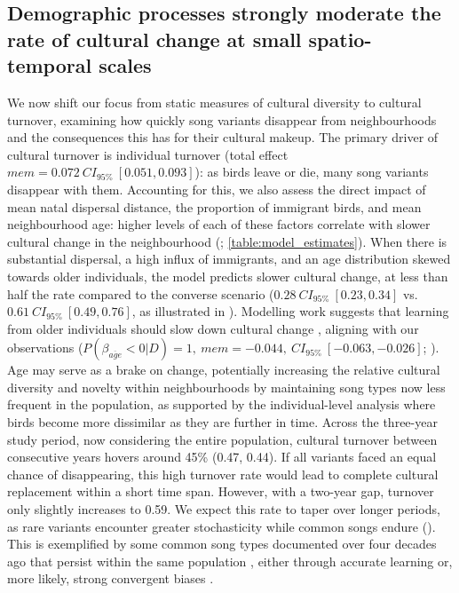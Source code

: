 \documentclass[9pt, twocolumn, twoside]{gsajnl}
\begin{document}
\subsection{Demographic processes strongly moderate the rate of cultural change at small spatio-temporal scales}

We now shift our focus from static measures of cultural diversity to cultural turnover, examining how quickly song variants disappear from neighbourhoods and the consequences this has for their cultural makeup. The primary driver of cultural turnover is individual turnover (total effect $mem = 0.072~CI_{95\%}~[0.051, 0.093]$): as birds leave or die, many song variants disappear with them. Accounting for this, we also assess the direct impact of mean natal dispersal distance, the proportion of immigrant birds, and mean neighbourhood age: higher levels of each of these factors correlate with slower cultural change in the neighbourhood (; \autoref{table:model_estimates}). When there is substantial dispersal, a high influx of immigrants, and an age distribution skewed towards older individuals, the model predicts slower cultural change, at less than half the rate compared to the converse scenario ($0.28~CI_{95\%}~[0.23, 0.34]$ vs. $0.61~CI_{95\%}~[0.49, 0.76]$, as illustrated in ). 
Modelling work suggests that learning from older individuals should slow down cultural change \parencite{kirby2021}, aligning with our observations ($P(\beta_{\overline{age}} < 0 | D) = 1,~mem=-0.044,~CI_{95\%}~[-0.063, -0.026]$; ). Age may serve as a brake on change, potentially increasing the relative cultural diversity and novelty within neighbourhoods by maintaining song types now less frequent in the population, as supported by the individual-level analysis where birds become more dissimilar as they are further in time. Across the three-year study period, now considering the entire population, cultural turnover between consecutive years hovers around 45\% (0.47, 0.44). If all variants faced an equal chance of disappearing, this high turnover rate would lead to complete cultural replacement within a short time span. However, with a two-year gap, turnover only slightly increases to 0.59. We expect this rate to taper over longer periods, as rare variants encounter greater stochasticity while common songs endure (). This is exemplified by some common song types documented over four decades ago that persist within the same population \parencite{mcgregor1982b, keen2020}, either through accurate learning or, more likely, strong convergent biases \parencite{lachlan2018, tchernichovski2021, james2017, claidiere2007}.
\end{document}
